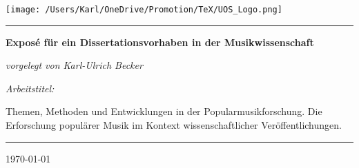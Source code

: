 \begin{titlepage}
    \centering
    \texttt{[image: /Users/Karl/OneDrive/Promotion/TeX/UOS\_Logo.png]}\par
    \noindent\rule[0.65em]{12cm}{0.1pt}\par
    \vspace{4cm}
    {\huge\bfseries \textsf{Exposé für ein Dissertationsvorhaben in der Musikwissenschaft}\par}
    \vspace{1cm}
    {\large\itshape vorgelegt von Karl-Ulrich Becker\par}
    \vspace{4cm}
    {\large\itshape \textsf{Arbeitstitel:}\par}
    \vspace{0.5cm}
    {\large Themen, Methoden und Entwicklungen in der Popularmusikforschung. Die Erforschung populärer Musik im Kontext wissenschaftlicher Veröffentlichungen. \par}
    \vfill
     \noindent\rule{12cm}{0.1pt}\par
    {\normalsize \today\par}
\end{titlepage}
\restoregeometry